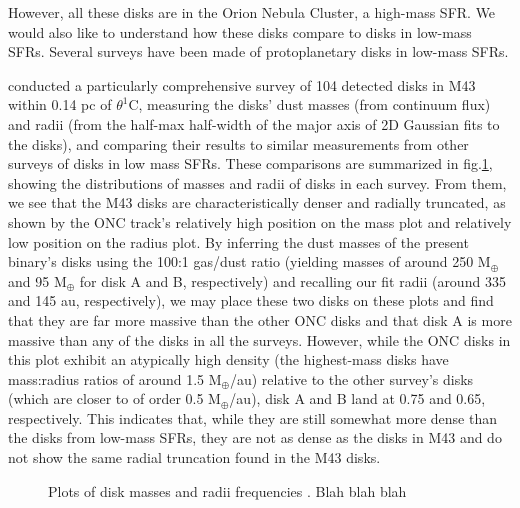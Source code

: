 
However, all these disks are in the Orion Nebula Cluster, a high-mass SFR. We would also like to understand how these disks compare to disks in low-mass SFRs. Several surveys have been made of protoplanetary disks in low-mass SFRs.

\citet{Eisner2018} conducted a particularly comprehensive survey of 104 detected disks in M43 within 0.14 pc of $\theta^1$C, measuring the disks' dust masses (from continuum flux) and radii (from the half-max half-width of the major axis of 2D Gaussian fits to the disks), and comparing their results to similar measurements from other surveys of disks in low mass SFRs. These comparisons are summarized in fig.\ref{fig:eisner18_disk_properties}, showing the distributions of masses and radii of disks in each survey. From them, we see that the M43 disks are characteristically denser and radially truncated, as shown by the ONC track's relatively high position on the mass plot and relatively low position on the radius plot. By inferring the dust masses of the present binary's disks using the 100:1 gas/dust ratio (yielding masses of around 250 M$_\oplus$ and 95 M$_\oplus$ for disk A and B, respectively) and recalling our fit radii (around 335 and 145 au, respectively), we may place these two disks on these plots and find that they are far more massive than the other ONC disks and that disk A is more massive than any of the disks in all the surveys. However, while the ONC disks in this plot exhibit an atypically high density (the highest-mass disks have mass:radius ratios of around 1.5 M$_\oplus$/au) relative to the other survey's disks (which are closer to of order 0.5 M$_\oplus$/au), disk A and B land at 0.75 and 0.65, respectively. This indicates that, while they are still somewhat more dense than the disks from low-mass SFRs, they are not as dense as the disks in M43 and do not show the same radial truncation found in the M43 disks.



\begin{figure}[h!]
  \centering
    \hspace*{\fill}%
    \hspace*{\fill}%
    \caption{Plots of disk masses and radii frequencies \citep{Eisner2018}. Blah blah blah}
    \label{fig:eisner18_disk_properties}
\end{figure}


